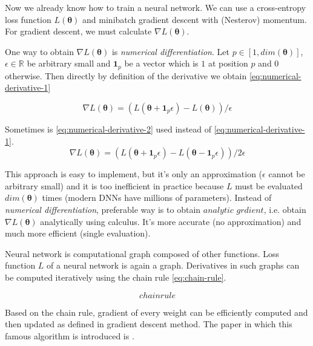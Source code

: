 Now we already know how to train a neural network. We can use a cross-entropy loss function $L (\pmb \theta)$ and minibatch gradient descent with (Nesterov) momentum. For gradient descent, we must calculate $\nabla L (\pmb \theta)$.

One way to obtain $\nabla L (\pmb \theta)$ is \textit{numerical differentiation}. 
Let $p \in [1, dim(\pmb \theta)]$, $\epsilon \in \mathbb{R}$ be arbitrary small and $\pmb 1_p$ be a vector which is $1$ at position $p$ and $0$ otherwise. Then directly by definition of the derivative we obtain \ref{eq:numerical-derivative-1}

\begin{equation}\label{eq:numerical-derivative-1}
\nabla L (\pmb \theta) = (L(\pmb \theta + \pmb 1_p \epsilon) - L (\pmb \theta)) / \epsilon
\end{equation}

Sometimes is \ref{eq:numerical-derivative-2} used instead of \ref{eq:numerical-derivative-1}.
\begin{equation}\label{eq:numerical-derivative-2}
\nabla L (\pmb \theta) = (L(\pmb \theta + \pmb 1_p \epsilon) - L (\pmb \theta - \pmb 1_p \epsilon)) / 2 \epsilon
\end{equation}

This approach is easy to implement, but it's only an approximation ($\epsilon$ cannot be arbitrary small) and it is too inefficient in practice because $L$ must be evaluated $dim(\pmb\theta)$ times (modern DNNs have millions of parameters). Instead of \textit{numerical differentiation}, preferable way is to obtain $\textit{analytic grdient}$, i.e. obtain $\nabla L (\pmb \theta)$ analytically using calculus. It's more accurate (no approximation) and much more efficient (single evaluation).


Neural network is computational graph composed of other functions. Loss function $L$ of a neural network is again a graph. Derivatives in such graphs can be computed iteratively using the chain rule \ref{eq:chain-rule}.

\begin{equation}\label{eq:chain-rule}
chain rule
\end{equation}


Based on the chain rule, gradient of every weight can be efficiently computed and then updated as defined in gradient descent method. The paper in which this famous algorithm is introduced is \cite{Rumelhart:1986:LIR:104279.104293}.